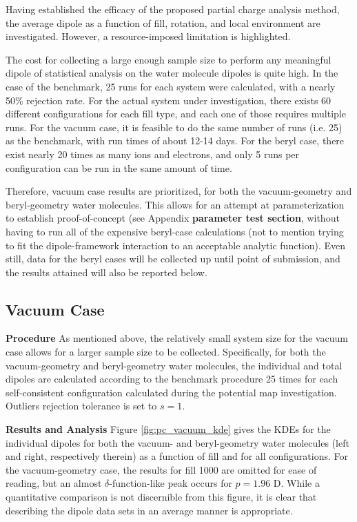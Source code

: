     Having established the efficacy of the proposed partial charge analysis method, the average dipole as a function of fill, rotation, and local environment are investigated. However, a resource-imposed limitation is highlighted.
    
    The cost for collecting a large enough sample size to perform any meaningful dipole of statistical analysis on the water molecule dipoles is quite high. In the case of the benchmark, 25 runs for each system were calculated, with a nearly 50\% rejection rate. For the actual system under investigation, there exists 60 different configurations for each fill type, and each one of those requires multiple runs. For the vacuum case, it is feasible to do the same number of runs (i.e. 25) as the benchmark, with run times of about 12-14 days. For the beryl case, there exist nearly 20 times as many ions and electrons, and only 5 runs per configuration can be run in the same amount of time. 
    
    Therefore, vacuum case results are prioritized, for both the vacuum-geometry and beryl-geometry water molecules. This allows for an attempt at parameterization to establish proof-of-concept (see Appendix \textbf{parameter test section}, without having to run all of the expensive beryl-case calculations (not to mention trying to fit the dipole-framework interaction to an acceptable analytic function). Even still, data for the beryl cases will be collected up until point of submission, and the results attained will also be reported below.
    
        \subsection{Vacuum Case}
        \label{sec:pc_vacuum_Case}
        
        \textbf{Procedure} As mentioned above, the relatively small system size for the vacuum case allows for a larger sample size to be collected. Specifically, for both the vacuum-geometry and beryl-geometry water molecules, the individual and total dipoles are calculated according to the benchmark procedure 25 times for each self-consistent configuration calculated during the potential map investigation. Outliers rejection tolerance is set to $s=1$.
        
        \textbf{Results and Analysis} Figure \ref{fig:pc_vacuum_kde} gives the KDEs for the individual dipoles for both the vacuum- and beryl-geometry water molecules (left and right, respectively therein) as a function of fill and for all configurations. For the vacuum-geometry case, the results for fill 1000 are omitted for ease of reading, but an almost $\delta$-function-like peak occurs for $p = 1.96$ D. While a quantitative comparison is not discernible from this figure, it is clear that describing the dipole data sets in an average manner is appropriate.
        
